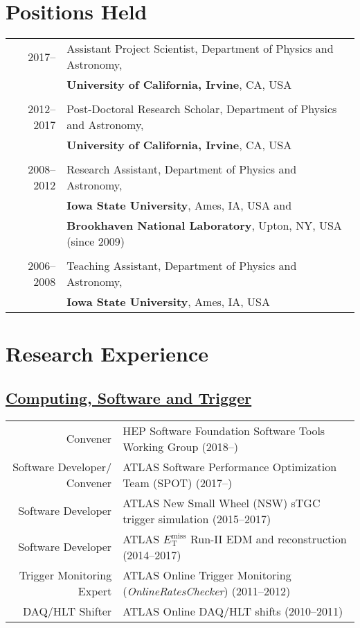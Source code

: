 \documentclass[a4paper,10pt]{article}
\begin{document}
\section{Positions Held}
\begin{tabular}{r|p{15.5cm}}
\textsc{2017--\phantom{0000}}		&		Assistant Project Scientist, Department of Physics and Astronomy, 		\\
							&		{\bf University of California, Irvine}, CA, USA  						\\
\multicolumn{2}{c}{} \\
\textsc{2012--2017}				&		Post-Doctoral Research Scholar, Department of Physics and Astronomy, 	\\
							&		{\bf University of California, Irvine}, CA, USA  						\\
\multicolumn{2}{c}{} \\
\textsc{2008--2012}				&		Research Assistant, Department of Physics and Astronomy, 			\\
							&		{\bf Iowa State University}, Ames, IA, USA and 						\\
							& 		{\bf Brookhaven National Laboratory}, Upton, NY, USA (since 2009)		\\
\multicolumn{2}{c}{} \\
\textsc{2006--2008}				&		Teaching Assistant, Department of Physics and Astronomy, 			\\
							&		{\bf Iowa State University}, Ames, IA, USA 						\\
\end{tabular}

\section{Research Experience}
\subsection{\underline{Computing, Software and Trigger}}
\begin{tabular}{r | p{12.7cm}}
\multicolumn{1}{r|}{Convener}					& HEP Software Foundation Software Tools Working Group \hfill (2018--\phantom{0000})		\\
\multicolumn{1}{r|}{Software Developer/ Convener}	& ATLAS Software Performance Optimization Team (SPOT) \hfill (2017--\phantom{0000})		\\
\multicolumn{1}{r|}{Software Developer}			& ATLAS New Small Wheel (NSW) sTGC trigger simulation \hfill (2015--2017)				\\
\multicolumn{1}{r|}{Software Developer}			& ATLAS $E_{\mathrm{T}}^{\mathrm{miss}}$ Run-II EDM and reconstruction \hfill (2014--2017)	\\
\multicolumn{1}{r|}{Trigger Monitoring Expert}		& ATLAS Online Trigger Monitoring ({\it OnlineRatesChecker})  \hfill (2011--2012)			\\
\multicolumn{1}{r|}{DAQ/HLT Shifter}				& ATLAS Online DAQ/HLT shifts	\hfill (2010--2011)								\\
\end{tabular}
\end{document}
